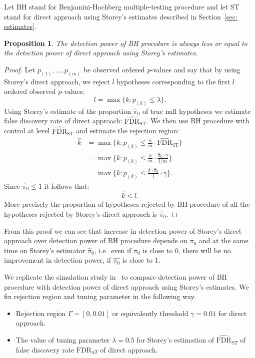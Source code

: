 \documentclass[10pt]{article}
\newtheorem{proposition}[theorem]{Proposition}
\begin{document}
Let BH stand for Benjamini-Hochberg multiple-testing procedure and let ST stand for direct approach using Storey's estimates described in Section~\ref{sec: estimates}.

\begin{proposition}
The detection power of BH procedure is always less or equal to the detection power of direct approach using Storey's estimates.
\end{proposition}
\begin{proof}
	Let $p_{(1)}, ..., p_{(m)}$ be observed ordered $p$-values and say that by using Storey's direct approach, we reject $l$ hypotheses corresponding to the first $l$ ordered observed $p$-values:
	\begin{equation}
	l = \max \lbrace k : p_{(k)} \leq \lambda \rbrace.
	\end{equation}
	Using Storey's estimate of the proportion $\widehat{\pi}_{0}$ of true null hypotheses we estimate false discovery rate of direct approach: $\widehat{\text{FDR}}_{\text{ST}}$. We then use BH procedure with control at level $\widehat{\text{FDR}}_{\text{ST}}$ and estimate the rejection region:
	\begin{align}
	\hat{k} 
	&=\max \lbrace k : p_{(k)} \leq \frac{k}{m} \cdot \widehat{\text{FDR}}_{\text{ST}} \rbrace \\
	&=\max \lbrace k : p_{(k)} \leq \frac{k}{m} \cdot \frac{\widehat{\pi}_{0} \cdot \gamma}{l / m} \rbrace \\
	&=\max \lbrace k : p_{(k)} \leq \frac{k \cdot \widehat{\pi}_{0}}{l} \cdot \gamma \rbrace.	
	\end{align}
	Since $\widehat{\pi}_{0} \leq 1$ it follows that:
	\begin{equation}
	\hat{k} \leq l.
	\end{equation}
	More precisely the proportion of hypotheses rejected by BH procedure of all the hypotheses rejected by Storey's direct approach is $\widehat{\pi}_{0}$.
\end{proof}
From this proof we can see that increase in detection power of Storey's direct approach over detection power of BH procedure depends on $\pi_{0}$ and at the same time on Storey's estimator $\widehat{\pi}_{0}$, i.e.\ even if $\pi_{0}$ is close to 0, there will be no improvement in detection power, if $\widehat{\pi_{0}}$ is close to 1. 

We replicate the simulation study in~\cite{Storey} to compare detection power of BH procedure with detection power of direct approach using Storey's estimates. We fix rejection region and tuning parameter in the following way.
\begin{itemize}
	\item Rejection region $\Gamma = [0, 0.01]$ or equivalently threshold $\gamma = 0.01$ for direct approach.
	\item The value of tuning parameter $\lambda = 0.5$ for Storey's estimation of  $\widehat{\text{FDR}}_{ST}$ of false discovery rate $\text{FDR}_{ST}$ of direct approach. 
\end{itemize}
\end{document}
